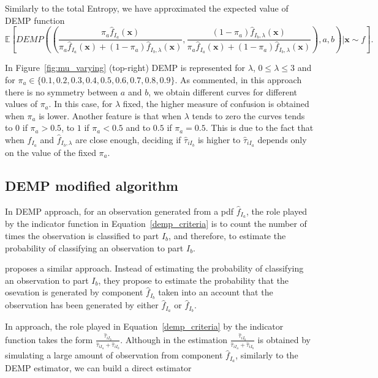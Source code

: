 \documentclass[10pt, a4paper]{article}
\newcommand{\m}[1]{\boldsymbol{#1}}
\begin{document}
Similarly to the total Entropy, we have approximated the expected value of DEMP function
\[
\mathbb{E}\left[DEMP \left(
 \left( 
 \frac{\pi_a \hat{f}_{I_a}(\m x)}{\pi_a \hat{f}_{I_a}(\m x) + (1-\pi_a) \hat{f}_{I_b, \lambda}(\m x)}, 
 \frac{(1-\pi_a) \hat{f}_{I_b, \lambda}(\m x)}{\pi_a \hat{f}_{I_a}(\m x) + (1-\pi_a) \hat{f}_{I_b, \lambda}(\m x)} \right), a, b\right) | \m x \sim f \right].
\]

In Figure~\ref{fig:mu_varying} (top-right) DEMP is represented for $\lambda$, $0 \leq \lambda \leq 3$ and for $\pi_a \in \{ 0.1, 0.2, 0.3, 0.4, 0.5, 0.6, 0.7, 0.8, 0.9\}$. As commented, in this approach there is no symmetry between $a$ and $b$, we obtain different curves for different values of $\pi_a$. In this case, for $\lambda$ fixed, the higher measure of confusion is obtained when $\pi_a$ is lower. Another feature is that when $\lambda$ tends to zero the curves tends to $0$ if $\pi_a > 0.5$, to $1$ if $\pi_a < 0.5$ and to $0.5$ if $\pi_a = 0.5$. This is due to the fact that when $\hat{f}_{I_a}$ and $\hat{f}_{I_b, \lambda}$ are close enough, deciding if $\hat{\tau}_{i I_{b}}$ is higher to $\hat{\tau}_{i I_{a}}$ depends only on the value of the fixed $\pi_a$.

\subsection*{DEMP modified algorithm}

In DEMP approach, for an observation generated from a pdf $\hat{f}_{I_a}$, the role played by the indicator function in Equation~\ref{demp_criteria} is to count the number of times the observation is classified to part $I_b$, and therefore, to estimate the probability of classifying an observation to part $I_b$.

\cite{longford2014} proposes a similar approach. Instead of estimating the probability of classifying an observation to part $I_b$, they propose to estimate the probability that the osevation is generated by component $\hat{f}_{I_b}$ taken into an account that the observation has been generated by either $\hat{f}_{I_a}$ or $\hat{f}_{I_b}$. 

In \cite{longford2014} approach, the role played in Equation~\ref{demp_criteria} by the indicator function takes the form $\frac{\hat{\tau}_{iI_b}}{\hat{\tau}_{iI_a} + \hat{\tau}_{iI_b}}$. Although in  \cite{longford2014} the estimation $\frac{\hat{\tau}_{iI_b}}{\hat{\tau}_{iI_a} + \hat{\tau}_{iI_b}}$ is obtained by simulating a large amount of observation from component $\hat{f}_{I_a}$, similarly to the DEMP estimator, we can build a direct estimator
\end{document}
